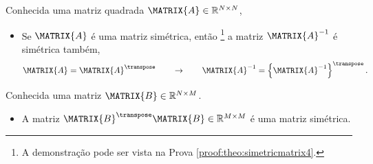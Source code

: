 \begin{theorem}\label{theo:simetricmatrix4}
Conhecida uma matriz quadrada $\MATRIX{A} \in \mathbb{R}^{N \times N}$, 
\begin{itemize}
\item Se $\MATRIX{A}$ é uma matriz simétrica, então
\footnote{A demonstração pode ser vista na Prova \ref{proof:theo:simetricmatrix4}.} 
 a matriz $\MATRIX{A}^{-1}$  é simétrica também,
\begin{equation}
\MATRIX{A}=\MATRIX{A}^{\transpose}
\qquad \rightarrow \qquad
\MATRIX{A}^{-1}=\left\{\MATRIX{A}^{-1}\right\}^{\transpose}.
\end{equation}
\end{itemize}
\end{theorem}

\begin{lema}\label{lema:simetricmatrix5}
Conhecida uma matriz $\MATRIX{B} \in \mathbb{R}^{N \times M}$.
\begin{itemize}
\item A matriz $\MATRIX{B}^{\transpose}\MATRIX{B} \in \mathbb{R}^{M \times M}$ é uma matriz simétrica.
\end{itemize}
\end{lema}


